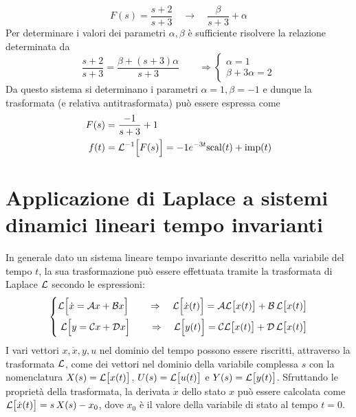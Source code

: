 			\begin{esempio}{}
				\[F(s)=\frac{s+2}{s+3} \quad \rightarrow \quad \frac{\beta}{s+3} + \alpha\]
				Per determinare i valori dei parametri $\alpha, \beta$ è sufficiente risolvere la relazione determinata da
				\[ \frac{s+2}{s+3} = \frac{\beta + (s+3)\alpha}{s+3} \qquad \Rightarrow \begin{cases}
					\alpha= 1\\
					\beta + 3 \alpha = 2
				\end{cases}  \]
				Da questo sistema si determinano i parametri $\alpha=1, \beta=-1$ e dunque la trasformata (e relativa antitrasformata) può essere espressa come
				\begin{align*}
					F(s) & = \frac{-1}{s+3} + 1 \\
					f(t) & = \mathcal L^{-1} \Big[F(s)\Big] = -1 e^{-3t} \textrm{scal}(t) + \textrm{imp}(t)
				\end{align*}
			\end{esempio}
		
\section{Applicazione di Laplace a sistemi dinamici lineari tempo invarianti}
	In generale dato un sistema lineare tempo invariante descritto nella variabile del tempo $t$, la sua trasformazione può essere effettuata tramite la trasformata di Laplace $\mathcal L$ secondo le espressioni:
	\[ \left\{ \begin{split}
		\mathcal L \Big[\dot x = \mathcal A x + \mathcal B x\Big] \qquad \Rightarrow \quad \mathcal L \Big[\dot x(t)\Big]  = \mathcal A \mathcal L\big[x(t)\big] + \mathcal B \, \mathcal L \big[x(t)\big] \\
		\mathcal L \Big[y = \mathcal C x + \mathcal D x\Big] \qquad \Rightarrow \quad \mathcal L \Big[y(t)\Big]  = \mathcal C \mathcal L\big[x(t)\big] + \mathcal D \, \mathcal L \big[x(t)\big]
	\end{split} \right.\]
	I vari vettori $x,\dot x, y, u$ nel dominio del tempo possono essere riscritti, attraverso la trasformata $\mathcal L$, come dei vettori nel dominio della variabile complessa $s$ con la nomenclatura $X(s) = \mathcal L \big[x(t)\big]$, $U(s) = \mathcal L\big[u(t)\big]$ e $Y(s) = \mathcal L\big[y(t)\big]$. Sfruttando le proprietà della trasformata, la derivata $\dot x$ dello stato $x$ può essere calcolata come $\mathcal L\big[\dot x(t)\big] = s\, X(s) - x_0$, dove $x_0$ è il valore della variabile di stato al tempo $t = 0$.
	
